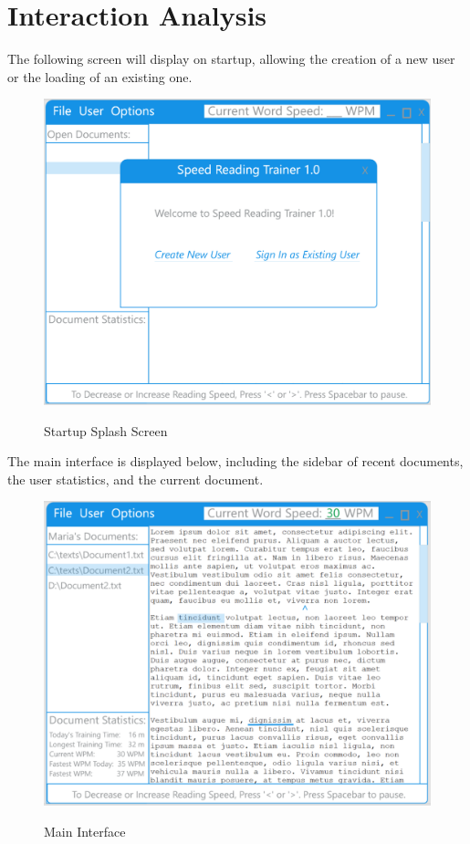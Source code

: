 \documentclass{article}
\begin{document}
\clearpage

\section*{Interaction Analysis}{

	The following screen will display on startup, allowing the creation of a new user or the loading of an existing one.\\

	\begin{figure}[!htb]
		\centering
		\includegraphics[scale=.7]{StartupSplashScreen.png}
		\label{fig:fig2}
		\caption{Startup Splash Screen}
	\end{figure}

	\clearpage

	The main interface is displayed below, including the sidebar of recent documents, the user statistics, and the current document.\\

	\begin{figure}[!htb]
		\centering
		\includegraphics[scale=.7]{MainInterface.png}
		\label{fig:fig3}
		\caption{Main Interface}
	\end{figure}

}
\end{document}
